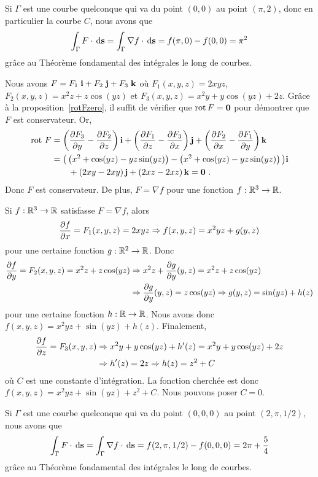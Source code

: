 {Si $\Gamma$ est une courbe quelconque qui va du point $(0,0)$ au point
$(\pi,2)$, donc en particulier la courbe $C$, nous avons que
\[
  \int_{\Gamma} F \cdot \,\mathrm{d}\mathbf{s}
  = \int_{\Gamma} \nabla f \cdot \,\mathrm{d}\mathbf{s}
  = f(\pi,0)-f(0,0) = \pi^2
\]
grâce au Théorème fondamental des intégrales le long de courbes.

Nous avons $F = F_1\; \mathbf{i} + F_2\; \mathbf{j} + F_3\; \mathbf{k}$ où $F_1(x,y,z) = 2xyz$,
$F_2(x,y,z) = x^2z + z\cos(yz)$ et $F_3(x,y,z) = x^2y + y \cos(yz) + 2z$.
Grâce à la proposition~\ref{rotFzero}, il suffit de vérifier que
$\displaystyle \operatorname{rot} F = \mathbf{0}$ pour démontrer que $F$ est
conservateur.  Or,
\begin{align*}
\operatorname{rot}\,F & = \left( \frac{\partial F_3}{\partial y} - \frac{\partial F_2}{\partial z} \right) \mathbf{i} +
\left( \frac{\partial F_1}{\partial z} - \frac{\partial F_3}{\partial x} \right) \mathbf{j} +
\left( \frac{\partial F_2}{\partial x}- \frac{\partial F_1}{\partial y} \right) \mathbf{k} \\
&= \big( \left(x^2 +\cos(yz) - yz\sin(yz)\right) -
\left( x^2 + \cos(yz) - yz\sin(yz)\right) \big) \mathbf{i} \\
&\qquad + \left( 2xy - 2xy \right) \mathbf{j} +
\left(2xz  - 2xz\right) \mathbf{k} = \mathbf{0} \ .
\end{align*}
Donc $F$ est conservateur.  De plus, $F = \nabla f$ pour une fonction
$f:\mathbb{R}^3 \to \mathbb{R}$.

Si $f:\mathbb{R}^3 \to \mathbb{R}$ satisfasse $F = \nabla f$, alors
\[
  \frac{\partial f}{\partial x} = F_1(x,y,z) = 2xyz \Rightarrow
  f(x,y,z) = x^2yz + g(y,z)
\]
pour une certaine fonction $g:\mathbb{R}^2 \to \mathbb{R}$.  Donc
\begin{align*}
  \frac{\partial f}{\partial y} = F_2(x,y,z) = x^2z + z\cos(yz) &\Rightarrow
  x^2z + \frac{\partial g}{\partial y}(y,z) = x^2z + z\cos(yz) \\
 & \Rightarrow
  \frac{\partial g}{\partial y}(y,z) = z\cos(yz) \Rightarrow
  g(y,z) = \sin(yz) + h(z)
\end{align*}
pour une certaine fonction $h:\mathbb{R} \to \mathbb{R}$.  Nous avons donc
$\displaystyle f(x,y,z) = x^2yz  +\sin(yz) + h(z)$.  Finalement,
\begin{align*}
  \frac{\partial f}{\partial z} = F_3(x,y,z) &\Rightarrow
  x^2y + y \cos(yz) + h'(z) = x^2y + y \cos(yz) + 2z \\
&\Rightarrow  h'(z) = 2z \Rightarrow h(z) = z^2 + C
\end{align*}
où $C$ est une constante d'intégration.  La fonction cherchée est donc
$\displaystyle f(x,y,z) = x^2yz  +\sin(yz) + z^2 + C$.
Nous pouvons poser $C=0$.

Si $\Gamma$ est une courbe quelconque qui va du point $(0,0,0)$ au point
$(2,\pi,1/2)$, nous avons que
\[
  \int_{\Gamma} F \cdot \,\mathrm{d}\mathbf{s}
  = \int_{\Gamma} \nabla f \cdot \,\mathrm{d}\mathbf{s}
  = f(2,\pi,1/2)-f(0,0,0) = 2\pi + \frac{5}{4}
\]
grâce au Théorème fondamental des intégrales le long de courbes.
}

